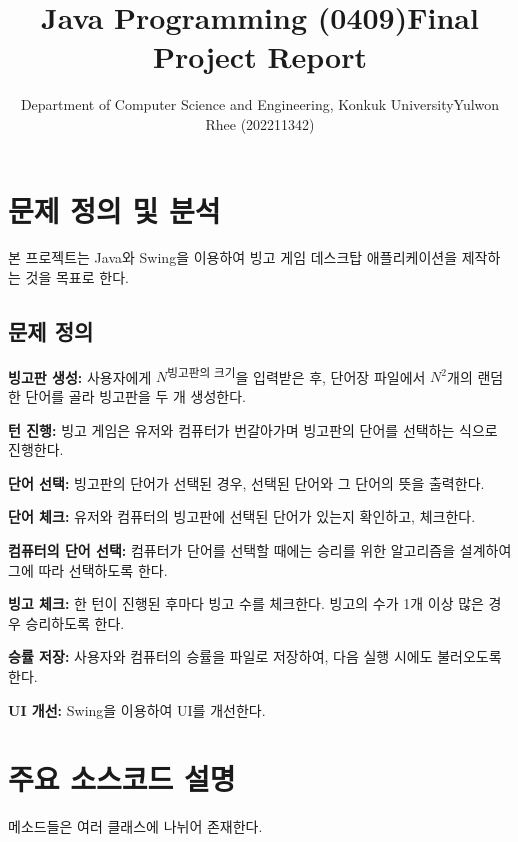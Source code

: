 



\title{Java Programming (0409)\newline\space Final Project Report}
\author{Department of Computer Science and Engineering, Konkuk University\newline\space Yulwon Rhee (202211342)}
\renewcommand\leftmark{Yulwon Rhee (202211342)}

\maketitle
\section{문제 정의 및 분석}
본 프로젝트는 Java와 Swing을 이용하여 빙고 게임 데스크탑 애플리케이션을 제작하는 것을 목표로 한다.

\subsection{문제 정의}
\textbf{빙고판 생성:}
사용자에게 $N$\textsuperscript{빙고판의 크기}을 입력받은 후, 단어장 파일에서 $N^2$개의 랜덤한 단어를 골라 빙고판을 두 개 생성한다.

\textbf{턴 진행:}
빙고 게임은 유저와 컴퓨터가 번갈아가며 빙고판의 단어를 선택하는 식으로 진행한다.

\textbf{단어 선택:}
빙고판의 단어가 선택된 경우, 선택된 단어와 그 단어의 뜻을 출력한다.

\textbf{단어 체크:}
유저와 컴퓨터의 빙고판에 선택된 단어가 있는지 확인하고, 체크한다.

\textbf{컴퓨터의 단어 선택:}
컴퓨터가 단어를 선택할 때에는 승리를 위한 알고리즘을 설계하여 그에 따라 선택하도록 한다.

\textbf{빙고 체크:}
한 턴이 진행된 후마다 빙고 수를 체크한다. 빙고의 수가 1개 이상 많은 경우 승리하도록 한다.

\textbf{승률 저장:}
사용자와 컴퓨터의 승률을 파일로 저장하여, 다음 실행 시에도 불러오도록 한다.

\textbf{UI 개선:}
Swing을 이용하여 UI를 개선한다.

\newpage
\section{주요 소스코드 설명}
메소드들은 여러 클래스에 나뉘어 존재한다.

